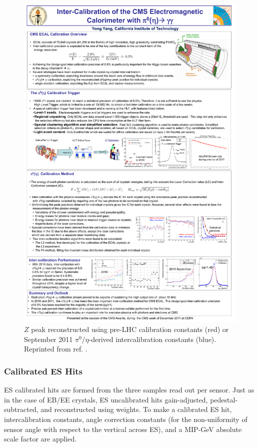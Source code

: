 \documentclass[dissertation.tex]{subfiles}
\begin{document}
\begin{figure}
	\centering
	\includegraphics[scale=0.5]{intercalibration}
	\caption{$Z$ peak reconstructed using pre-LHC calibration constants (red) or September 2011 $\pi^{0}/\eta$-derived intercalibration constants (blue).  Reprinted from ref. \cite{Yang}.}
	\label{fig:intercalibration}
\end{figure}

\subsubsection{Calibrated ES Hits}
\label{sec:Calibrated ES Hits}

\marginpar{\textcolor{blue}{Added parenthetical remark}}ES calibrated hits are formed from the three samples read out per sensor.  Just as in the case of EB/EE crystals, ES uncalibrated hits gain-adjusted, pedestal-subtracted, and reconstructed using weights.  To make a calibrated ES hit, intercalibration constants, angle correction constants (for the non-uniformity of sensor angle with respect to the vertical across ES), and a MIP-GeV absolute scale factor are applied.
\end{document}
